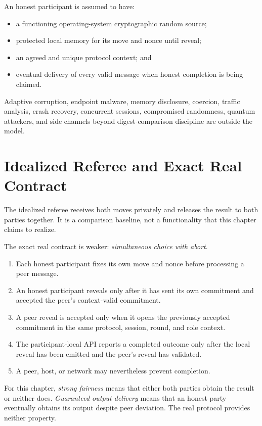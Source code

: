 An honest participant is assumed to have:

\begin{itemize}
    \item a functioning operating-system cryptographic random source;
    \item protected local memory for its move and nonce until reveal;
    \item an agreed and unique protocol context; and
    \item eventual delivery of every valid message when honest completion is
    being claimed.
\end{itemize}

Adaptive corruption, endpoint malware, memory disclosure, coercion, traffic
analysis, crash recovery, concurrent sessions, compromised randomness,
quantum attackers, and side channels beyond digest-comparison discipline are
outside the model.

\section{Idealized Referee and Exact Real Contract}

The idealized referee receives both moves privately and releases the result to
both parties together. It is a comparison baseline, not a functionality that
this chapter claims to realize.

The exact real contract is weaker: \emph{simultaneous choice with abort}.

\begin{enumerate}
    \item Each honest participant fixes its own move and nonce before
    processing a peer message.
    \item An honest participant reveals only after it has sent its own
    commitment and accepted the peer's context-valid commitment.
    \item A peer reveal is accepted only when it opens the previously accepted
    commitment in the same protocol, session, round, and role context.
    \item The participant-local API reports a completed outcome only after the
    local reveal has been emitted and the peer's reveal has validated.
    \item A peer, host, or network may nevertheless prevent completion.
\end{enumerate}

For this chapter, \emph{strong fairness} means that either both parties obtain
the result or neither does. \emph{Guaranteed output delivery} means that an
honest party eventually obtains its output despite peer deviation. The real
protocol provides neither property.


